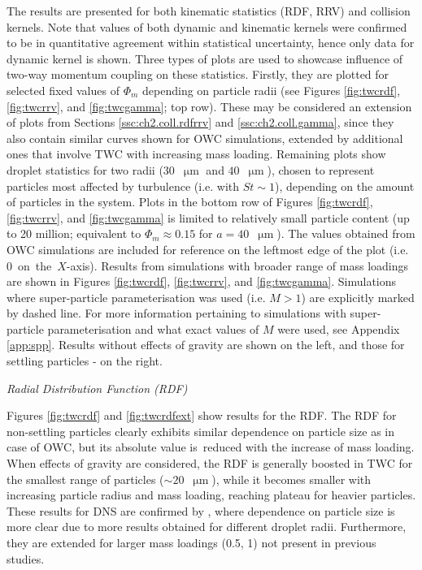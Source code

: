 \documentclass{pracamgren}
\begin{document}
The results are presented for both kinematic statistics (RDF, RRV) and collision kernels.
Note that values of both dynamic and kinematic kernels were confirmed to be in quantitative agreement within statistical uncertainty, hence only data for dynamic kernel is shown.
Three types of plots are used to showcase influence of two-way momentum coupling on these statistics.
Firstly, they are plotted for selected fixed values of $\Phi_m$ depending on particle radii (see Figures \ref{fig:twcrdf}, \ref{fig:twcrrv}, and \ref{fig:twcgamma}; top row).
These may be considered an extension of plots from Sections \ref{ssc:ch2.coll.rdfrrv} and \ref{ssc:ch2.coll.gamma}, since they also contain similar curves shown for OWC simulations, extended by additional ones that involve TWC with increasing mass loading.
Remaining plots show droplet statistics for two radii ($30$~$\upmu\text{m}$ and $40$~$\upmu\text{m}$), chosen to represent particles most affected by turbulence (i.e. with $St \sim 1$), depending on the amount of particles in the system.
Plots in the bottom row of Figures \ref{fig:twcrdf}, \ref{fig:twcrrv}, and \ref{fig:twcgamma} is limited to relatively small particle content (up to 20 million; equivalent to $\Phi_m \approx 0.15$ for $a = 40$~$\upmu\text{m}$).
The values obtained from OWC simulations are included for reference on the leftmost edge of the plot (i.e.~$0$~on~the~$X$-axis). 
Results from simulations with broader range of mass loadings are shown in Figures \ref{fig:twcrdf}, \ref{fig:twcrrv}, and \ref{fig:twcgamma}.
Simulations where super-particle parameterisation was used (i.e. $M>1$) are explicitly marked by dashed line.
For more information pertaining to simulations with super-particle parameterisation and what exact values of $M$ were used, see Appendix \ref{app:spp}.
Results without effects of gravity are shown on the left, and those for settling particles - on the right. 

\medskip

\emph{Radial Distribution Function (RDF)}

Figures \ref{fig:twcrdf} and \ref{fig:twcrdfext} show results for the RDF.
The RDF for non-settling particles clearly exhibits similar dependence on particle size as in case of OWC, but its absolute value is~reduced with the increase of mass loading.
When effects of gravity are considered, the RDF is generally boosted in TWC for the smallest range of particles ($\sim 20$~$\upmu\text{m}$), while it becomes smaller with increasing particle radius and mass loading, reaching plateau for heavier particles.
These results for DNS are confirmed by \textcite[Fig. 19]{Rosa2020}, where dependence on particle size is more clear due to more results obtained for different droplet radii.
Furthermore, they are extended for larger mass loadings (0.5, 1) not present in previous studies.
\end{document}
